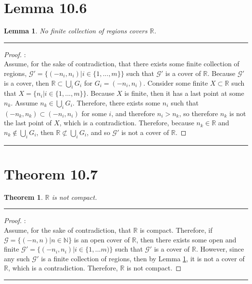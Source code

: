 \documentclass[openany, amssymb, psamsfonts]{amsart}
\newcommand{\bbN}{\mathbb{N}}
\newcommand{\bbR}{\mathbb{R}}
\newtheorem{thm}{Theorem}[section]
\newtheorem{lem}{Lemma}[section]
\theoremstyle{definition}
\numberwithin{equation}{section}
\begin{document}
\section*{Lemma 10.6}
\begin{lem}
\label{10.6}
No finite collection of regions covers $\bbR$.
\end{lem}
 \vspace{4pt}     \hrule   \vspace{4pt} \begin{proof}:\\
Assume, for the sake of contradiction, that there exists some finite collection of regions, $\mathcal{G'} = \{(-n_i,n_i)| i\in \{{1,...,m}\}\}$ such that $\mathcal{G'}$ is a cover of $\bbR$. Because $\mathcal{G'}$ is a cover, then $\bbR \subset \bigcup_iG_i$ for $G_i=(-n_i,n_i)$. Consider some finite $X\subset \bbR$ such that $X = \{n_i | i\in \{1,...,m\}\}$. Because $X$ is finite, then it has a last point at some $n_k$. Assume $n_k\in \bigcup_iG_i$. Therefore, there exists some $n_i$ such that $(-n_k,n_k)\subset (-n_i,n_i)$ for some $i$, and therefore $n_i>n_k$, so therefore $n_k$ is not the last point of $X$, which is a contradiction. Therefore, because $n_k\in \bbR$ and $n_k\notin \bigcup_iG_i$, then $\bbR \not \subset \bigcup_iG_i$, and so $\mathcal{G'}$ is not a cover of $\bbR$.
\end{proof} \vspace{4pt}     \hrule   \vspace{4pt}

\section*{Theorem 10.7}
\begin{thm} 
\label{10.7}
$\bbR$ is not compact.
\end{thm}
 \vspace{4pt}     \hrule   \vspace{4pt} \begin{proof}:\\
Assume, for the sake of contradiction, that $\bbR$ is compact. Therefore, if $\mathcal{G} = \{(-n,n) | n\in \bbN\}$ is an open cover of $\bbR$, then there exists some open and finite $\mathcal{G'} = \{(-n_i, n_i) | i \in \{1,...m)\}$ such that $\mathcal{G'}$ is a cover of $\bbR$. However, since any such $\mathcal{G'}$ is a finite collection of regions, then by Lemma \ref{10.6}, it is not a cover of $\bbR$, which is a contradiction. Therefore, $\bbR$ is not compact.
\end{proof} \vspace{4pt}     \hrule   \vspace{4pt}
\end{document}
